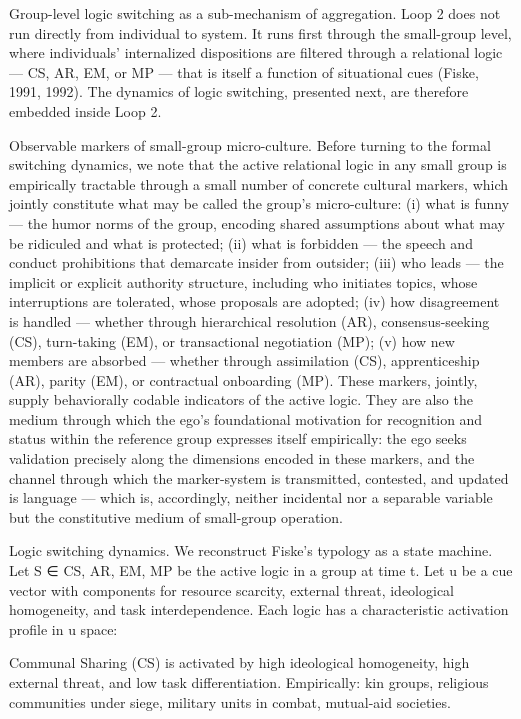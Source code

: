\documentclass[12pt,a4paper]{article}
\begin{document}
Group-level logic switching as a sub-mechanism of aggregation. Loop 2 does not run directly from individual to system. It runs first through the small-group level, where individuals' internalized dispositions are filtered through a relational logic --- CS, AR, EM, or MP --- that is itself a function of situational cues (Fiske, 1991, 1992). The dynamics of logic switching, presented next, are therefore embedded inside Loop 2.


Observable markers of small-group micro-culture. Before turning to the formal switching dynamics, we note that the active relational logic in any small group is empirically tractable through a small number of concrete cultural markers, which jointly constitute what may be called the group's micro-culture: (i) what is funny --- the humor norms of the group, encoding shared assumptions about what may be ridiculed and what is protected; (ii) what is forbidden --- the speech and conduct prohibitions that demarcate insider from outsider; (iii) who leads --- the implicit or explicit authority structure, including who initiates topics, whose interruptions are tolerated, whose proposals are adopted; (iv) how disagreement is handled --- whether through hierarchical resolution (AR), consensus-seeking (CS), turn-taking (EM), or transactional negotiation (MP); (v) how new members are absorbed --- whether through assimilation (CS), apprenticeship (AR), parity (EM), or contractual onboarding (MP). These markers, jointly, supply behaviorally codable indicators of the active logic. They are also the medium through which the ego's foundational motivation for recognition and status within the reference group expresses itself empirically: the ego seeks validation precisely along the dimensions encoded in these markers, and the channel through which the marker-system is transmitted, contested, and updated is language --- which is, accordingly, neither incidental nor a separable variable but the constitutive medium of small-group operation.


Logic switching dynamics. We reconstruct Fiske's typology as a state machine. Let S ∈ {CS, AR, EM, MP} be the active logic in a group at time t. Let u be a cue vector with components for resource scarcity, external threat, ideological homogeneity, and task interdependence. Each logic has a characteristic activation profile in u space:


Communal Sharing (CS) is activated by high ideological homogeneity, high external threat, and low task differentiation. Empirically: kin groups, religious communities under siege, military units in combat, mutual-aid societies.
\end{document}
